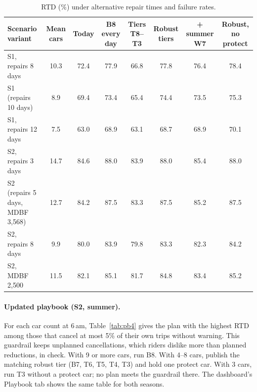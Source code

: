 \documentclass[11pt]{article}
\begin{document}
\begin{table}[ht]\centering\small
\begin{tabular}{@{}lccccccc@{}}
\toprule
Scenario variant & Mean cars & Today & B8 every day & Tiers T8--T3 & Robust tiers & + summer W7 & Robust, no protect \\
\midrule
S1, repairs 8 days & 10.3 & 72.4 & 77.9 & 66.8 & 77.8 & 76.4 & 78.4 \\
S1 (repairs 10 days) & 8.9 & 69.4 & 73.4 & 65.4 & 74.4 & 73.5 & 75.3 \\
S1, repairs 12 days & 7.5 & 63.0 & 68.9 & 63.1 & 68.7 & 68.9 & 70.1 \\
S2, repairs 3 days & 14.7 & 84.6 & 88.0 & 83.9 & 88.0 & 85.4 & 88.0 \\
S2 (repairs 5 days, MDBF 3,568) & 12.7 & 84.2 & 87.5 & 83.3 & 87.5 & 85.2 & 87.5 \\
S2, repairs 8 days & 9.9 & 80.0 & 83.9 & 79.8 & 83.3 & 82.3 & 84.2 \\
S2, MDBF 2,500 & 11.5 & 82.1 & 85.1 & 81.7 & 84.8 & 83.4 & 85.2 \\
\bottomrule
\end{tabular}
\caption{RTD (\%) under alternative repair times and failure rates.}\label{tab:rtdsens}
\end{table}


\paragraph{Updated playbook (S2, summer).} For each car count at 6\,am, Table~\ref{tab:pb4} gives the plan with the highest RTD among those that cancel at most 5\% of their own trips without warning. This guardrail keeps unplanned cancellations, which riders dislike more than planned reductions, in check. With 9 or more cars, run B8. With 4--8 cars, publish the matching robust tier (B7, T6, T5, T4, T3) and hold one protect car. With 3 cars, run T3 without a protect car; no plan meets the guardrail there. The dashboard's Playbook tab shows the same table for both seasons.
\end{document}
